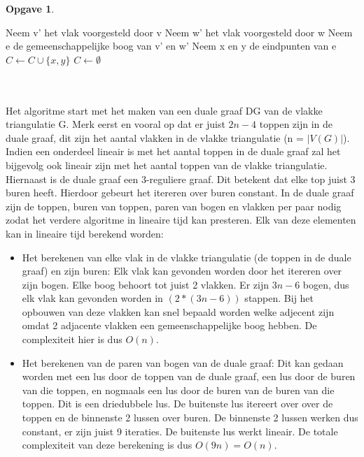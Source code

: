 \documentclass[11pt, a4paper, table]{article}
\makeatletter
\newenvironment{algoritme}[1][H]{%
	\renewcommand{\ALG@name}{Algoritme}%
	\renewcommand{\algorithmicrequire}{\textbf{Input:}}
	\renewcommand{\algorithmicensure}{\textbf{Output:}}
	\begin{algorithm}[#1]%
	}{\end{algorithm}}
\theoremstyle{definition}
\newtheorem{opgave}{Opgave}
\theoremstyle{definition}
\theoremstyle{definition}
\makeatother
\begin{document}
\begin{opgave}
\begin{tcolorbox}[blanker,float=tbp, grow to left by=2cm,grow to right by=2cm]
\begin{algoritme}
\begin{algorithmic}[1]
			\EndWhile\label{alg2:endyutsis}
			 \label{alg2:Mloop}
			\State Neem v' het vlak voorgesteld door v
			\State Neem w' het vlak voorgesteld door w
			\State Neem e de gemeenschappelijke boog van v' en w'
			\State Neem x en y de eindpunten van e
			\State $C \gets C \cup \{x,y\}$
			\EndIf 
			\EndFor
			\EndFor \label{alg2:endMloop}
			\Else 
			\State $C \gets \emptyset$
			\EndIf
		\end{algorithmic}
	\end{algoritme}
\end{tcolorbox}
\\\\Het algoritme start met het maken van een duale graaf DG van de vlakke triangulatie G. Merk eerst en vooral op dat er juist $2n-4$ toppen zijn in de duale graaf, dit zijn het aantal vlakken in de vlakke triangulatie (n = $|V(G)|$). Indien een onderdeel lineair is met het aantal toppen in de duale graaf zal het bijgevolg ook lineair zijn met het aantal toppen van de vlakke triangulatie. Hiernaast is de duale graaf een 3-reguliere graaf. Dit betekent dat elke top juist 3 buren heeft. Hierdoor gebeurt het itereren over buren constant. In de duale graaf zijn de toppen, buren van toppen, paren van bogen en vlakken per paar nodig zodat het verdere algoritme in lineaire tijd kan presteren. Elk van deze elementen kan in lineaire tijd berekend worden:
\begin{itemize}
	\item Het berekenen van elke vlak in de vlakke triangulatie (de toppen in de duale graaf) en zijn buren: Elk vlak kan gevonden worden door het itereren over zijn bogen. Elke boog behoort tot juist 2 vlakken. Er zijn $3n-6$ bogen, dus elk vlak kan gevonden worden in $(2*(3n-6))$ stappen. Bij het opbouwen van deze vlakken kan snel bepaald worden welke adjecent zijn omdat 2 adjacente vlakken een gemeenschappelijke boog hebben. De complexiteit hier is dus $O(n)$.
	\item Het berekenen van de paren van bogen van de duale graaf: Dit kan gedaan worden met een lus door de toppen van de duale graaf, een lus door de buren van die toppen, en nogmaals een lus door de buren van de buren van die toppen. Dit is een driedubbele lus. De buitenste lus itereert over over de toppen en de binnenste 2 lussen over buren. De binnenste 2 lussen werken dus constant, er zijn juist 9 iteraties. De buitenste lus werkt lineair. De totale complexiteit van deze berekening is dus $O(9n) = O(n)$.

\end{itemize}
\end{opgave}
\end{document}
